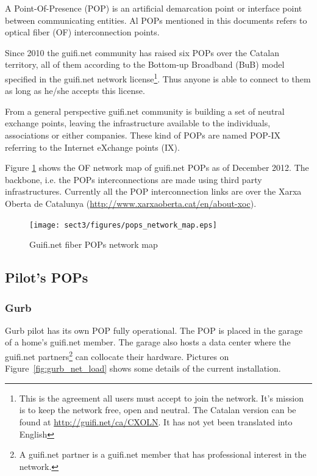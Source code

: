 A Point-Of-Presence (POP) is an artificial demarcation point or interface point between communicating entities. Al POPs mentioned in this documents refers to optical fiber (OF) interconnection points.

Since 2010 the guifi.net community has raised six POPs over the Catalan territory, all of them according to the Bottom-up Broadband (BuB) model specified in the guifi.net network license\footnote{This is the agreement all users must accept to join the network. It's mission is to keep the network free, open and neutral. The Catalan version can be found at \url{http://guifi.net/ca/CXOLN}. It has not yet been translated into English}.
Thus anyone is able to connect to them as long as he/she accepts this license.

From a general perspective guifi.net community is building a set of neutral exchange points, leaving the infrastructure available to the individuals, associations or either companies. These kind of POPs are named POP-IX referring to the Internet eXchange points (IX).

Figure \ref{fig:fibre_map} shows the OF network map of guifi.net POPs as of December 2012. The backbone, i.e. the POPs interconnections are made using third party infrastructures. Currently all the POP interconnection links are over the Xarxa Oberta de Catalunya (\url{http://www.xarxaoberta.cat/en/about-xoc}).

\begin{figure}[htbp]
  \centering
  \texttt{[image: sect3/figures/pops\_network\_map.eps]} 
  \caption{Guifi.net fiber POPs network map}
  \label{fig:fibre_map}
\end{figure}


\FloatBarrier
\subsection{Pilot's POPs}

\FloatBarrier
\subsubsection{Gurb}
Gurb pilot has its own POP fully operational. The POP is placed in the garage of a home's guifi.net member. The garage also hosts a data center where the guifi.net partners\footnote{A guifi.net partner is a guifi.net member that has professional interest in the network.} can collocate their hardware. Pictures on Figure~\ref{fig:gurb_net_load} shows some details of the current installation.


